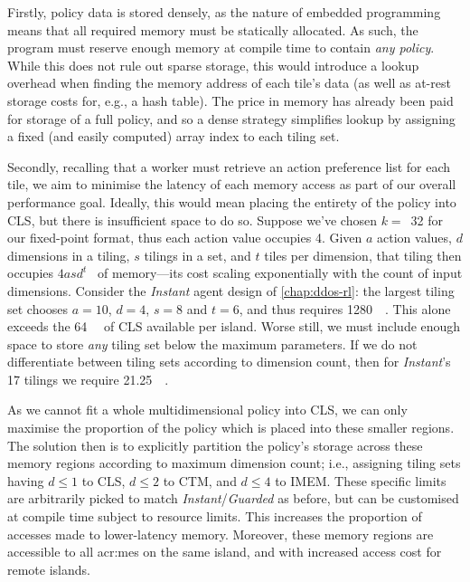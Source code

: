 Firstly, policy data is stored densely, as the nature of embedded programming means that all required memory must be statically allocated.
As such, the program must reserve enough memory at compile time to contain \emph{any policy}.
While this does not rule out sparse storage, this would introduce a lookup overhead when finding the memory address of each tile's data (as well as at-rest storage costs for, e.g., a hash table).
The price in memory has already been paid for storage of a full policy, and so a dense strategy simplifies lookup by assigning a fixed (and easily computed) array index to each tiling set.

Secondly, recalling that a worker must retrieve an action preference list for each tile, we aim to minimise the latency of each memory access as part of our overall performance goal.
Ideally, this would mean placing the entirety of the policy into CLS, but there is insufficient space to do so.
Suppose we've chosen $k=$~\num{32} for our fixed-point format, thus each action value occupies \qty{4}{\byte}.
Given $a$ action values, $d$ dimensions in a tiling, $s$ tilings in a set, and $t$ tiles per dimension, that tiling then occupies $4asd^t$~\unit{\byte} of memory---its cost scaling exponentially with the count of input dimensions.
Consider the \emph{Instant} agent design of \cref{chap:ddos-rl}: the largest tiling set chooses $a=10$, $d=4$, $s=8$ and $t=6$, and thus requires \qty{1280}{\kibi\byte}.
This alone exceeds the \qty{64}{\kibi\byte} of CLS available per island.
Worse still, we must include enough space to store \emph{any} tiling set below the maximum parameters.
If we do not differentiate between tiling sets according to dimension count, then for \emph{Instant}'s \num{17} tilings we require \qty{21.25}{\mebi\byte}.

As we cannot fit a whole multidimensional policy into CLS, we can only maximise the proportion of the policy which is placed into these smaller regions.
The solution then is to explicitly partition the policy's storage across these memory regions according to maximum dimension count; i.e., assigning tiling sets having $d\le1$ to CLS, $d\le2$ to CTM, and $d\le4$ to IMEM.
These specific limits are arbitrarily picked to match \emph{Instant}/\emph{Guarded} as before, but can be customised at compile time subject to resource limits.
This increases the proportion of accesses made to lower-latency memory.
Moreover, these memory regions are accessible to all \glspl{acr:me} on the same island, and with increased access cost for remote islands.

